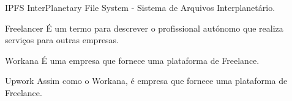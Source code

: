 \begin{siglas}
    \item[IPFS] InterPlanetary File System - Sistema de Arquivos Interplanetário.
    \item[Freelancer] É um termo para descrever o profissional autónomo que realiza serviços para outras empresas.
    \item[Workana] É uma empresa que fornece uma plataforma de Freelance.
    \item[Upwork] Assim como o Workana, é empresa que fornece uma plataforma de Freelance.
\end{siglas}